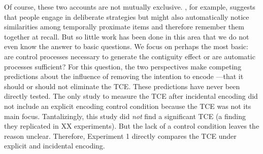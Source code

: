 \documentclass[jou,natbib,floatsintext]{apa6} %
\begin{document}
Of course, these two accounts are not mutually exclusive. \citet{Hint16}, for example, suggests that people engage in deliberate strategies but might also automatically notice similarities among temporally proximate items and therefore remember them together at recall. But so little work has been done in this area that we do not even know the answer to basic questions. We focus on perhaps the most basic: are control processes necessary to generate the contiguity effect or are automatic processes sufficient? For this question, the two perspectives make competing predictions about the influence of removing the intention to encode ---that it should or should not eliminate the TCE. These predictions have never been directly tested. The only study to measure the TCE after incidental encoding \citep{NairEtal17} did not include an explicit encoding control condition because the TCE was not its main focus. Tantalizingly, this study did \emph{not} find a significant TCE (a finding they replicated in XX experiments). But the lack of a control condition leaves the reason unclear. Therefore, Experiment 1 directly compares the TCE under explicit and incidental encoding.












\end{document}
